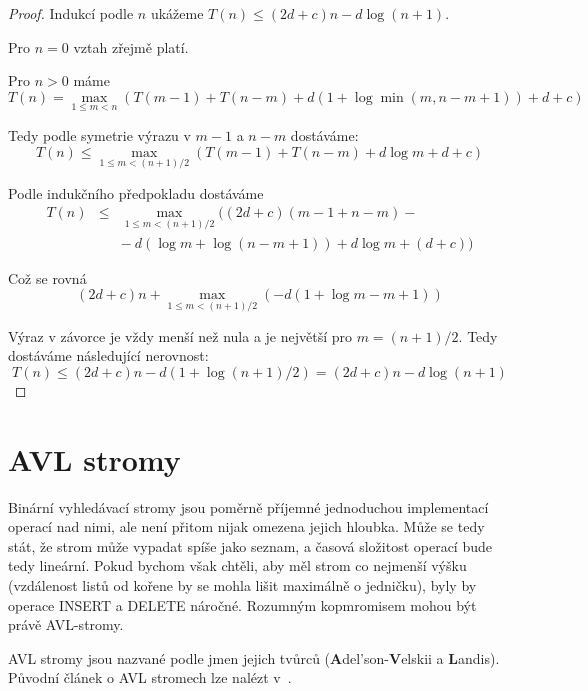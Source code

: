 \begin{proof}
Indukcí podle $n$ ukážeme $T(n) \leq (2d + c)n - d\log(n + 1)$.

Pro $n=0$ vztah zřejmě platí.

Pro $n > 0$ máme 
\begin{equation} 
T(n) = \max_{1 \leq m < n}(T(m-1) + T(n-m) +  d(1 + \log \min(m, n - m + 1)) + d + c) 
\end{equation} 

Tedy podle symetrie výrazu v $m - 1$ a $n - m$ dostáváme:
\begin{equation} 
T(n) \leq \max_{1 \leq m < (n+1)/2}(T(m-1) + T(n-m) +  d\log m + d + c)
\end{equation} 

Podle indukčního předpokladu dostáváme
\begin{eqnarray} 
\nonumber T(n) & \leq & \max_{1 \leq m < (n+1)/2}((2d+c)(m-1+n-m)- \\ && -\ d(\log m + \log(n-m+1)) + d \log m + (d +c))
\end{eqnarray} 

Což se rovná
\begin{equation} 
(2d+c)n + \max_{1 \leq m < (n+1)/2}(-d(1 + \log m - m + 1))
\end{equation} 

Výraz v závorce je vždy menší než nula a je největší pro 
$m = (n + 1) / 2$. Tedy dostáváme následující nerovnost:
\begin{equation} 
T(n) \leq (2d+c)n - d(1 + \log(n+1)/2) = (2d+c)n - d\log(n+1) 
\end{equation} 
\end{proof}


\section{AVL stromy}

Binární vyhledávací stromy jsou poměrně příjemné jednoduchou implementací
operací nad nimi, ale není přitom nijak omezena jejich hloubka. Může se
tedy stát, že strom může vypadat spíše jako seznam, a časová složitost
operací bude tedy lineární. Pokud bychom však chtěli, aby měl strom co
nejmenší výšku (vzdálenost listů od kořene by se mohla lišit maximálně o
jedničku), byly by operace INSERT a DELETE náročné. Rozumným
kopmromisem mohou být právě AVL-stromy.

AVL stromy jsou nazvané podle jmen jejich tvůrců ({\bf A}del'son-{\bf V}elskii 
a {\bf L}andis). Původní článek o AVL stromech lze nalézt v~\cite{AVL-trees}.

